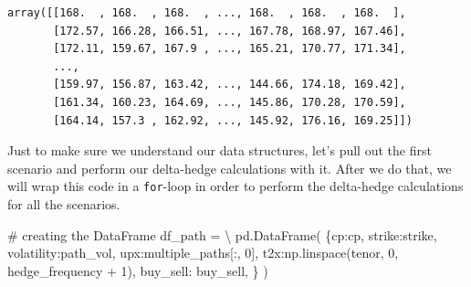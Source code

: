 \documentclass[
  letterpaper,
  DIV=11,
  numbers=noendperiod]{scrreprt}
\newenvironment{Shaded}{\begin{snugshade}}{\end{snugshade}}
\newcommand{\CommentTok}[1]{\textcolor[rgb]{0.37,0.37,0.37}{#1}}
\newcommand{\DecValTok}[1]{\textcolor[rgb]{0.68,0.00,0.00}{#1}}
\newcommand{\NormalTok}[1]{\textcolor[rgb]{0.00,0.23,0.31}{#1}}
\newcommand{\OperatorTok}[1]{\textcolor[rgb]{0.37,0.37,0.37}{#1}}
\newcommand{\StringTok}[1]{\textcolor[rgb]{0.13,0.47,0.30}{#1}}
\begin{document}
\begin{verbatim}
array([[168.  , 168.  , 168.  , ..., 168.  , 168.  , 168.  ],
       [172.57, 166.28, 166.51, ..., 167.78, 168.97, 167.46],
       [172.11, 159.67, 167.9 , ..., 165.21, 170.77, 171.34],
       ...,
       [159.97, 156.87, 163.42, ..., 144.66, 174.18, 169.42],
       [161.34, 160.23, 164.69, ..., 145.86, 170.28, 170.59],
       [164.14, 157.3 , 162.92, ..., 145.92, 176.16, 169.25]])
\end{verbatim}

Just to make sure we understand our data structures, let's pull out the
first scenario and perform our delta-hedge calculations with it. After
we do that, we will wrap this code in a \texttt{for}-loop in order to
perform the delta-hedge calculations for all the scenarios.

\begin{Shaded}
\begin{Highlighting}[]
\CommentTok{\# creating the DataFrame}
\NormalTok{df\_path }\OperatorTok{=} \OperatorTok{\textbackslash{}}
\NormalTok{    pd.DataFrame(}
\NormalTok{        \{}\StringTok{\textquotesingle{}cp\textquotesingle{}}\NormalTok{:cp,}
         \StringTok{\textquotesingle{}strike\textquotesingle{}}\NormalTok{:strike,}
         \StringTok{\textquotesingle{}volatility\textquotesingle{}}\NormalTok{:path\_vol,}
         \StringTok{\textquotesingle{}upx\textquotesingle{}}\NormalTok{:multiple\_paths[:, }\DecValTok{0}\NormalTok{], }
         \StringTok{\textquotesingle{}t2x\textquotesingle{}}\NormalTok{:np.linspace(tenor, }\DecValTok{0}\NormalTok{, hedge\_frequency }\OperatorTok{+} \DecValTok{1}\NormalTok{),}
         \StringTok{\textquotesingle{}buy\_sell\textquotesingle{}}\NormalTok{: buy\_sell,}
\NormalTok{        \}       }
\NormalTok{    )}


\end{Highlighting}
\end{Shaded}
\end{document}
